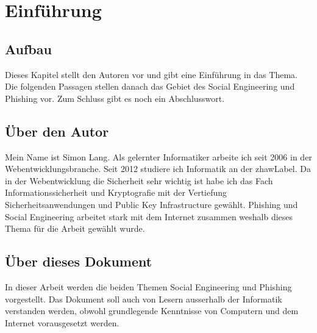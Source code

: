 \chapter{Einführung}
\label{sec:einfuehrung}

\section{Aufbau}
Dieses Kapitel stellt den Autoren vor und gibt eine Einführung in das Thema.
Die folgenden Passagen stellen danach das Gebiet des Social Engineering und Phishing vor.
Zum Schluss gibt es noch ein Abschlusswort.

\section{Über den Autor}
\label{sec:einfuehrung:autor}
Mein Name ist Simon Lang. Als gelernter Informatiker arbeite ich seit 2006 in der Webentwicklungsbranche.
Seit 2012 studiere ich Informatik an der \Gls{zhawLabel}.
Da in der Webentwicklung die Sicherheit sehr wichtig ist habe ich das Fach Informationssicherheit und Kryptografie mit der Vertiefung Sicherheitsanwendungen und Public Key Infrastructure gewählt. 
Phishing und Social Engineering arbeitet stark mit dem Internet zusammen weshalb dieses Thema für die Arbeit gewählt wurde.

\section{Über dieses Dokument}
In dieser Arbeit werden die beiden Themen Social Engineering und Phishing vorgestellt. 
Das Dokument soll auch von Lesern ausserhalb der Informatik verstanden werden, obwohl grundlegende Kenntnisse von Computern und dem Internet vorausgesetzt werden.

